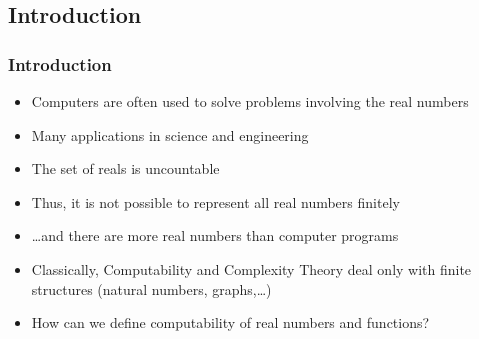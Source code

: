 \subsection{Introduction}
\begin{frame}
  \frametitle{Introduction}
  \begin{itemize}[<+->]
      \item Computers are often used to solve problems involving the real numbers
      \item Many applications in science and engineering
      \item The set of reals is uncountable
      \item Thus, it is not possible to represent all real numbers finitely
      \item \ldots and there are more real numbers than computer programs
      \item Classically, Computability and Complexity Theory deal only with finite structures (natural numbers, graphs,\ldots)
      \item How can we define computability of real numbers and functions?
  \end{itemize}
\end{frame}
